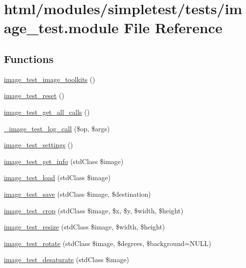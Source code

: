 \hypertarget{image__test_8module}{
\section{html/modules/simpletest/tests/image\_\-test.module File Reference}
\label{image__test_8module}
}
\subsection*{Functions}
\begin{DoxyCompactItemize}
\item 
\hyperlink{image__test_8module_a5e12de459d4da7789a210060e584e9d6}{image\_\-test\_\-image\_\-toolkits} ()
\item 
\hyperlink{image__test_8module_a30ba1bb2238f38e31212ca0544a0a88c}{image\_\-test\_\-reset} ()
\item 
\hyperlink{image__test_8module_a3f28c9aa17b3a20708dbe6329f1f26f9}{image\_\-test\_\-get\_\-all\_\-calls} ()
\item 
\hyperlink{image__test_8module_a2cf5b9a663a0483ddc64f8e9a4c3b318}{\_\-image\_\-test\_\-log\_\-call} (\$op, \$args)
\item 
\hyperlink{image__test_8module_a624f95685880e7e1a76bd8f5c8631525}{image\_\-test\_\-settings} ()
\item 
\hyperlink{image__test_8module_abd63bedf9d7d28fce9c3fd677e54a7b0}{image\_\-test\_\-get\_\-info} (stdClass \$image)
\item 
\hyperlink{image__test_8module_a1bedb17b61df956adac6c295378ca8cc}{image\_\-test\_\-load} (stdClass \$image)
\item 
\hyperlink{image__test_8module_a233ff1e77ce386b8bd7c18ab6ba778ed}{image\_\-test\_\-save} (stdClass \$image, \$destination)
\item 
\hyperlink{image__test_8module_a245169be5747393a397f119c2fdf9bb7}{image\_\-test\_\-crop} (stdClass \$image, \$x, \$y, \$width, \$height)
\item 
\hyperlink{image__test_8module_a37dbf54501f682a348a35e651e934f99}{image\_\-test\_\-resize} (stdClass \$image, \$width, \$height)
\item 
\hyperlink{image__test_8module_a53cdec44e6cce8926e3e67ee73490b34}{image\_\-test\_\-rotate} (stdClass \$image, \$degrees, \$background=NULL)
\item 
\hyperlink{image__test_8module_aad1992f25f15693079e9b804301825cb}{image\_\-test\_\-desaturate} (stdClass \$image)
\end{DoxyCompactItemize}


